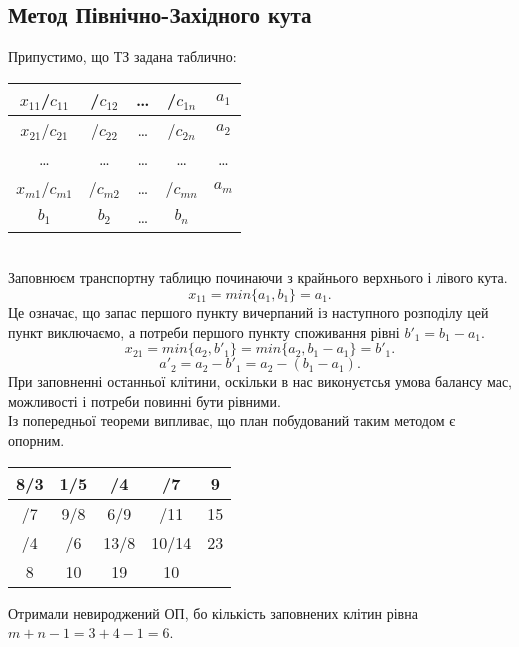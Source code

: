 \documentclass[12pt]{book}
\begin{document}
\subsection{Метод Північно-Західного кута}
Припустимо, що ТЗ задана таблично:\\
\begin{tabular}{ | c | c | c | c | c |}
\hline
$x_{11}$/$c_{11}$	&	/$c_{12}$	&	\dots	&	/$c_{1n}$	&	$a_1$\\
\hline
$x_{21}$/$c_{21}$	&	/$c_{22}$	&	\dots	&	/$c_{2n}$	&	$a_2$\\
\hline
\dots	&	\dots	&	\dots	&	\dots	&	\dots\\
\hline
$x_{m1}$/$c_{m1}$	&	/$c_{m2}$	&	\dots	&	/$c_{mn}$	&	$a_m$\\
\hline
$b_1$	&	$b_2$	&	\dots	&	$b_n$	&\\
\hline
\end{tabular}\\
Заповнюєм транспортну таблицю починаючи з крайнього верхнього і лівого кута.\\
$$x_{11} = min\{a_1,b_1\}=a_1.$$
Це означає, що запас першого пункту вичерпаний із наступного розподілу цей пункт виключаємо, а потреби першого пункту споживання рівні $b'_1=b_1-a_1$.
$$x_{21} = min\{a_2,b'_1\} = min\{a_2,b_1-a_1\} = b'_1.$$
$$a'_2=a_2-b'_1=a_2-(b_1-a_1).$$
При заповненні останньої клітини, оскільки в нас виконуєтсья умова балансу мас, можливості і потреби повинні бути рівними.\\
Із попередньої теореми випливає, що план побудований таким методом є опорним.\\
\begin{tabular}{ | c | c | c | c | c |}
\hline
8/3	&	1/5	&	/4	&	/7		&	9\\
\hline
/7	&	9/8	&	6/9	&	/11		&	15\\
\hline
/4	&	/6	&	13/8	&	10/14	&	23\\
\hline
8	&	10	&	19	&	10		&\\
\hline
\end{tabular}
Отримали невироджений ОП, бо кількість заповнених клітин рівна $m+n-1 = 3+4-1 = 6$.\\
\end{document}
